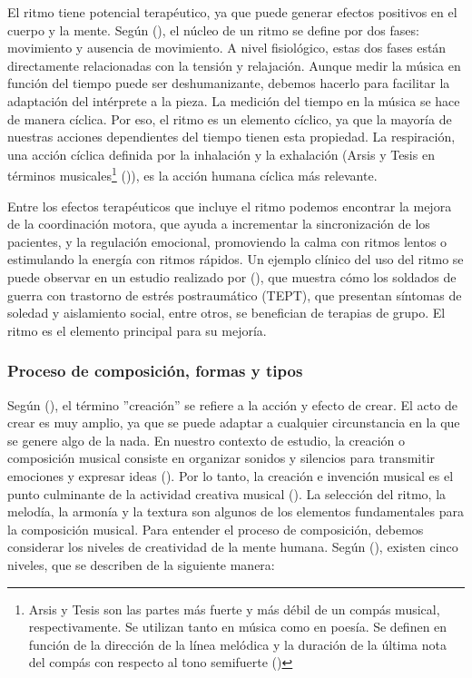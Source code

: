 El ritmo tiene potencial terapéutico, ya que puede generar efectos positivos en el cuerpo y la mente. Según \citeauthor{JARAH:1977} (\citeyear{JARAH:1977}), el núcleo de un ritmo se define por dos fases: movimiento y ausencia de movimiento. A nivel fisiológico, estas dos fases están directamente relacionadas con la tensión y relajación. Aunque medir la música en función del tiempo puede ser deshumanizante, debemos hacerlo para facilitar la adaptación del intérprete a la pieza. La medición del tiempo en la música se hace de manera cíclica. Por eso, el ritmo es un elemento cíclico, ya que la mayoría de nuestras acciones dependientes del tiempo tienen esta propiedad. La respiración, una acción cíclica definida por la inhalación y la exhalación (Arsis y Tesis en términos musicales\footnote{Arsis y Tesis son las partes más fuerte y más débil de un compás musical, respectivamente. Se utilizan tanto en música como en poesía. Se definen en función de la dirección de la línea melódica y la duración de la última nota del compás con respecto al tono semifuerte (\cite{CASTELLANOS:2009})} (\cite{CASTELLANOS:2009})), es la acción humana cíclica más relevante. 

Entre los efectos terapéuticos que incluye el ritmo podemos encontrar la mejora de la coordinación motora, que ayuda a incrementar la sincronización de los pacientes, y la regulación emocional, promoviendo la calma con ritmos lentos o estimulando la energía con ritmos rápidos. Un ejemplo clínico del uso del ritmo se puede observar en un estudio realizado por \citeauthor{BENSIMON:2008} (\citeyear{BENSIMON:2008}), que muestra cómo los soldados de guerra con trastorno de estrés postraumático (TEPT), que presentan síntomas de soledad y aislamiento social, entre otros, se benefician de terapias de grupo. El ritmo es el elemento principal para su mejoría.

\subsubsection{Proceso de composición, formas y tipos}

Según \citeauthor{RAE:2024} (\citeyear{RAE:2024}), el término ''creación'' se refiere a la acción y efecto de crear. El acto de crear es muy amplio, ya que se puede adaptar a cualquier circunstancia en la que se genere algo de la nada. En nuestro contexto de estudio, la creación o composición musical consiste en organizar sonidos y silencios para transmitir emociones y expresar ideas (\cite{MMARTIN:2024}). Por lo tanto, la creación e invención musical es el punto culminante de la actividad creativa musical (\cite{SUBIRATS:2004}). La selección del ritmo, la melodía, la armonía y la textura son algunos de los elementos fundamentales para la composición musical. Para entender el proceso de composición, debemos considerar los niveles de creatividad de la mente humana. Según \citeauthor{SUBIRATS:2004} (\citeyear{SUBIRATS:2004}), existen cinco niveles, que se describen de la siguiente manera:

